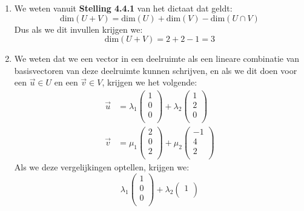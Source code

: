 \documentclass[12pt, a4paper]{article}
\begin{document}
\begin{enumerate}[(a.)]
\item 
We weten vanuit \textbf{Stelling 4.4.1} van het dictaat dat geldt:
\begin{equation}
    \text{dim}(U + V) = \text{dim}(U) + \text{dim}(V) - \text{dim}(U \cap V) 
\end{equation}
Dus als we dit invullen krijgen we:
\begin{equation}
    \text{dim}(U + V) = 2 + 2 - 1 = 3
\end{equation}

\item
We weten dat we een vector in een deelruimte als een lineare combinatie van basisvectoren 
van deze deelruimte kunnen schrijven, 
en als we dit doen voor een $\vec{u} \in U$ en een $\vec{v} \in V$, krijgen we het volgende:
\begin{align}
    \vec{u} &=  
    \lambda_1\begin{pmatrix}
        1 \\
        0 \\
        0 \\
    \end{pmatrix}
    +
    \lambda_2\begin{pmatrix}
        1 \\
        2 \\
        0 \\
    \end{pmatrix} \\
    \vec{v} &=
    \mu_1\begin{pmatrix}
        2 \\
        0 \\
        2 \\
    \end{pmatrix}
    +
    \mu_2\begin{pmatrix}
        -1 \\
        4 \\
        2 \\
    \end{pmatrix}
\end{align} 
Als we deze vergelijkingen optellen, krijgen we:
\begin{equation}
    \lambda_1\begin{pmatrix}
        1 \\
        0 \\
        0 \\
    \end{pmatrix}
    +
    \lambda_2\begin{pmatrix}
        1 \\

\end{pmatrix}
\end{equation}
\end{enumerate}
\end{document}
